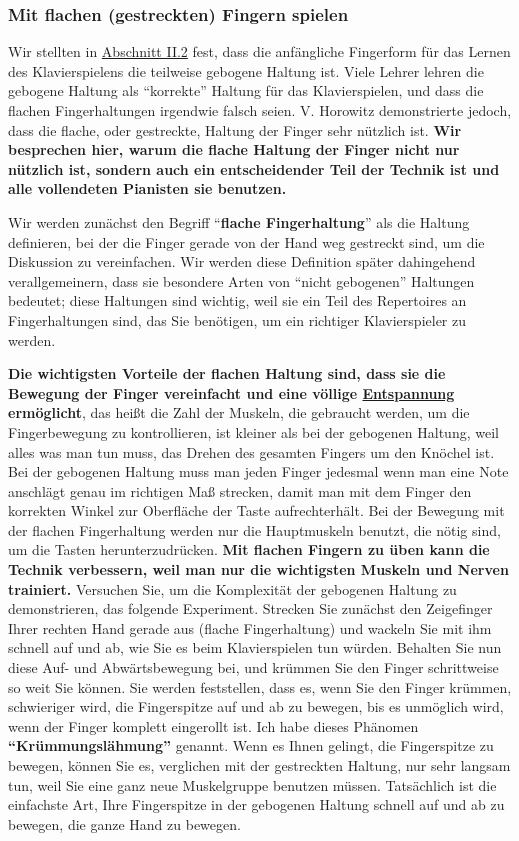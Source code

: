 
\subsubsection{Mit flachen (gestreckten) Fingern spielen}
\label{c1iii4b}

Wir stellten in \hyperref[c1ii2]{Abschnitt II.2} fest, dass die anfängliche Fingerform für das Lernen des Klavierspielens die teilweise gebogene Haltung ist.
Viele Lehrer lehren die gebogene Haltung als \enquote{korrekte} Haltung für das Klavierspielen, und dass die flachen Fingerhaltungen irgendwie falsch seien.
V. Horowitz demonstrierte jedoch, dass die flache, oder gestreckte, Haltung der Finger sehr nützlich ist.
\textbf{Wir besprechen hier, warum die flache Haltung der Finger nicht nur nützlich ist, sondern auch ein entscheidender Teil der Technik ist und alle vollendeten Pianisten sie benutzen.}

Wir werden zunächst den Begriff \enquote{\textbf{flache Fingerhaltung}} als die Haltung definieren, bei der die Finger gerade von der Hand weg gestreckt sind, um die Diskussion zu vereinfachen.
Wir werden diese Definition später dahingehend verallgemeinern, dass sie besondere Arten von \enquote{nicht gebogenen} Haltungen bedeutet; diese Haltungen sind wichtig, weil sie ein Teil des Repertoires an Fingerhaltungen sind, das Sie benötigen, um ein richtiger Klavierspieler zu werden.

\textbf{Die wichtigsten Vorteile der flachen Haltung sind, dass sie die Bewegung der Finger vereinfacht und eine völlige \hyperref[c1ii14]{Entspannung} ermöglicht}, das heißt die Zahl der Muskeln, die gebraucht werden, um die Fingerbewegung zu kontrollieren, ist kleiner als bei der gebogenen Haltung, weil alles was man tun muss, das Drehen des gesamten Fingers um den Knöchel ist.
Bei der gebogenen Haltung muss man jeden Finger jedesmal wenn man eine Note anschlägt genau im richtigen Maß strecken, damit man mit dem Finger den korrekten Winkel zur Oberfläche der Taste aufrechterhält.
Bei der Bewegung mit der flachen Fingerhaltung werden nur die Hauptmuskeln benutzt, die nötig sind, um die Tasten herunterzudrücken.
\textbf{Mit flachen Fingern zu üben kann die Technik verbessern, weil man nur die wichtigsten Muskeln und Nerven trainiert.}
Versuchen Sie, um die Komplexität der gebogenen Haltung zu demonstrieren, das folgende Experiment.
Strecken Sie zunächst den Zeigefinger Ihrer rechten Hand gerade aus (flache Fingerhaltung) und wackeln Sie mit ihm schnell auf und ab, wie Sie es beim Klavierspielen tun würden.
Behalten Sie nun diese Auf- und Abwärtsbewegung bei, und krümmen Sie den Finger schrittweise so weit Sie können.
Sie werden feststellen, dass es, wenn Sie den Finger krümmen, schwieriger wird, die Fingerspitze auf und ab zu bewegen, bis es unmöglich wird, wenn der Finger komplett eingerollt ist.
Ich habe dieses Phänomen \textbf{\enquote{Krümmungslähmung}} genannt.
Wenn es Ihnen gelingt, die Fingerspitze zu bewegen, können Sie es, verglichen mit der gestreckten Haltung, nur sehr langsam tun, weil Sie eine ganz neue Muskelgruppe benutzen müssen.
Tatsächlich ist die einfachste Art, Ihre Fingerspitze in der gebogenen Haltung schnell auf und ab zu bewegen, die ganze Hand zu bewegen.

